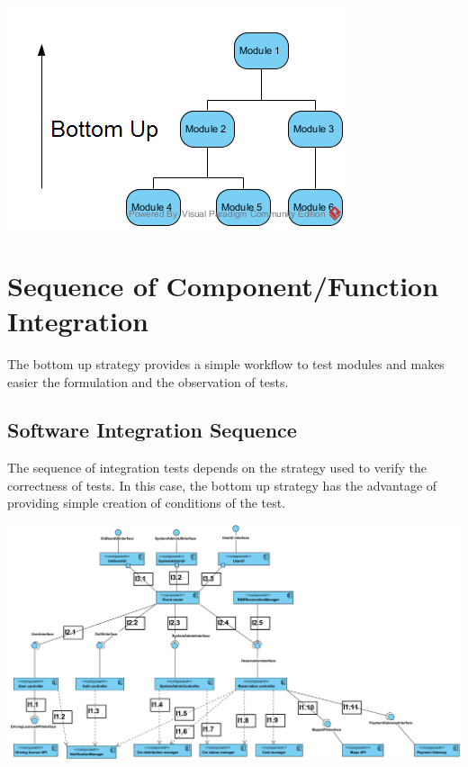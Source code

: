 \begin{minipage}{\textwidth}
\includegraphics[width=\textwidth, keepaspectratio]{../images/bottom_up.png}
\end{minipage}

\section{Sequence of Component/Function Integration}
The bottom up strategy provides a simple workflow to test modules and makes easier the formulation and the observation of tests.

\subsection{Software Integration Sequence}
The sequence of integration tests depends on the strategy used to verify the correctness of tests.
In this case, the bottom up strategy has the advantage of providing simple creation of conditions of the test.

\begin{minipage}{\textwidth}
\includegraphics[width=\textwidth, keepaspectratio]{../images/diagram/integration_sequence.png}
\end{minipage}


